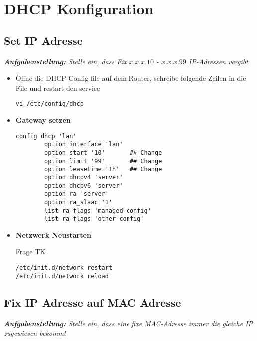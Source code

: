 \section{DHCP Konfiguration}
\subsection{Set IP Adresse}
\textit{\textbf{Aufgabenstellung:} Stelle ein, dass Fix $x.x.x.10$ - $x.x.x.99$ IP-Adressen vergibt}

\begin{itemize}
\item Öffne die DHCP-Config file auf dem Router, schreibe folgende Zeilen in die File und restart den service
\begin{verbatim}
vi /etc/config/dhcp
\end{verbatim}

\item \textbf{Gateway setzen}
\begin{verbatim}
config dhcp 'lan'
        option interface 'lan'
        option start '10'		## Change
        option limit '99'		## Change
        option leasetime '1h'  	## Change
        option dhcpv4 'server'
        option dhcpv6 'server'
        option ra 'server'
        option ra_slaac '1'
        list ra_flags 'managed-config'
        list ra_flags 'other-config'
\end{verbatim}

\item \textbf{Netzwerk Neustarten}
\begin{Huge} Frage TK \end{Huge}
\begin{verbatim}
/etc/init.d/network restart
/etc/init.d/network reload
\end{verbatim}
\end{itemize}

\newpage

\subsection{Fix IP Adresse auf MAC Adresse}
\textit{\textbf{Aufgabenstellung:} Stelle ein, dass eine fixe MAC-Adresse immer die gleiche IP zugewiesen bekommt}

